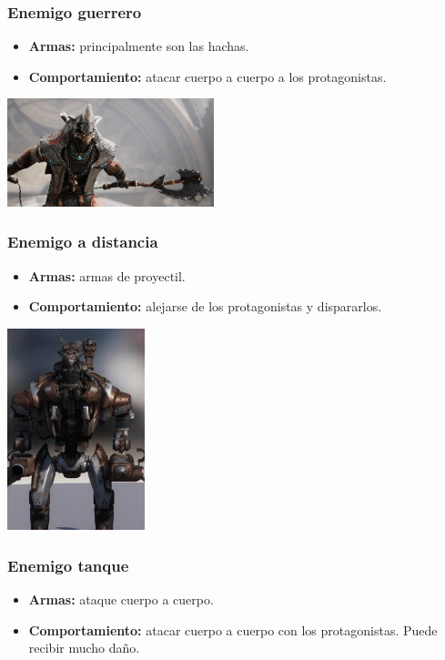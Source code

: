 \documentclass[11pt, twoside]{article}
\begin{document}
\subsubsection{Enemigo guerrero}
\begin{itemize}
\item \textbf{Armas:} principalmente son las hachas.
\item \textbf{Comportamiento:} atacar cuerpo a cuerpo a los protagonistas.
\end{itemize}

\begin{center}
\includegraphics[width=6cm]{./images/guerrero.jpg}
\end{center}

\subsubsection{Enemigo a distancia}
\begin{itemize}
\item \textbf{Armas:} armas de proyectil.
\item \textbf{Comportamiento:} alejarse de los protagonistas y dispararlos.
\end{itemize}

\begin{center}
\includegraphics[width=4cm]{./images/distancia.jpg}
\end{center}

\subsubsection{Enemigo tanque}
\begin{itemize}
\item \textbf{Armas:} ataque cuerpo a cuerpo. 
\item \textbf{Comportamiento:} atacar cuerpo a cuerpo con los protagonistas. Puede recibir mucho daño. 
\end{itemize}
\end{document}
